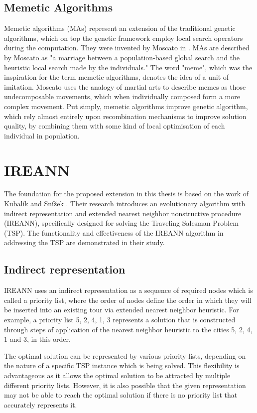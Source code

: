 \documentclass[twoside]{ctuthesis}
\theoremstyle{plain}
\theoremstyle{definition}
\theoremstyle{note}
\begin{document}
\subsection{Memetic Algorithms}
Memetic algorithms (MAs) represent an extension of the traditional genetic algorithms, which on top the genetic framework employ local search operators during the computation. They were invented by Moscato in \cite{moscato1989evolution}. MAs are described by Moscato as "a marriage between a population-based global search and the heuristic local search made by the individuals." The word "meme", which was the inspiration for the term memetic algorithms, denotes the idea of a unit of imitation. Moscato uses the analogy of martial arts to describe memes as those undecomposable movements, which when individually composed form a more complex movement. Put simply, memetic algorithms improve genetic algorithm, which rely almost entirely upon recombination mechanisms to improve solution quality, by combining them with some kind of local optimisation of each individual in population. 

\section{IREANN}
The foundation for the proposed extension in this thesis is based on the work of Kubalík and Snížek \cite{kubalik2014novel}. Their research introduces an evolutionary algorithm with indirect representation and extended nearest neighbor nonstructive procedure (IREANN), specifically designed for solving the Traveling Salesman Problem (TSP). The functionality and effectiveness of the IREANN algorithm in addressing the TSP are demonstrated in their study.

\subsection{Indirect representation}
IREANN uses an indirect representation as a sequence of required nodes which is called a priority list, where the order of nodes define the order in which they will be inserted into an existing tour via extended nearest neighbor heuristic. For example, a priority list {5, 2, 4, 1, 3} represents a solution that is constructed through steps of application of the nearest neighbor heuristic to the cities 5, 2, 4, 1 and 3, in this order.

The optimal solution can be represented by various priority lists, depending on the nature of a specific TSP instance which is being solved. This flexibility is advantageous as it allows the optimal solution to be attracted by multiple different priority lists. However, it is also possible that the given representation may not be able to reach the optimal solution if there is no priority list that accurately represents it.
\end{document}
